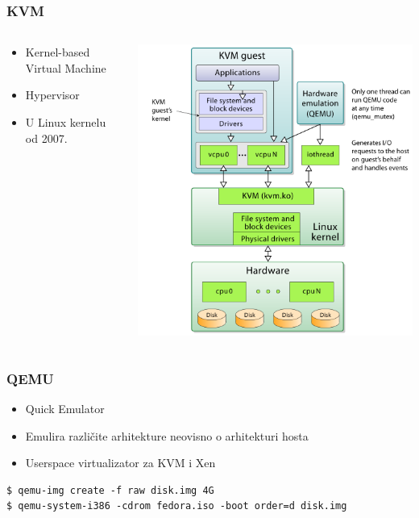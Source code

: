 \documentclass[t]{beamer}
\begin{document}
\begin{frame}
	\frametitle{KVM}
	\begin{columns}[T]
	\begin{column}{0.5\textwidth}
		\begin{itemize}
			\item Kernel-based Virtual Machine
			\item Hypervisor
			\item U Linux kernelu od 2007.
		\end{itemize}
	\end{column}
	\begin{column}{0.5\textwidth}
		\includegraphics[width=\textwidth]{kvm.png}
	\end{column}
	\end{columns}
\end{frame}


\begin{frame}[fragile]
	\frametitle{QEMU}
	\begin{itemize}
		\item Quick Emulator
	\end{itemize}
	\begin{itemize}
		\item Emulira različite arhitekture neovisno o arhitekturi hosta
		\item Userspace virtualizator za KVM i Xen
	\end{itemize}
	\vfill
	\small
	\begin{verbatim}
$ qemu-img create -f raw disk.img 4G
$ qemu-system-i386 -cdrom fedora.iso -boot order=d disk.img
	\end{verbatim}
\end{frame}
\end{document}
